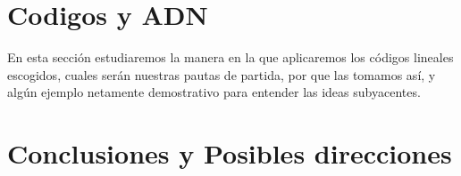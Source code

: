 \documentclass[12pt]{article}
\begin{document}
\section{Codigos y ADN}
En esta sección estudiaremos la manera en la que aplicaremos los códigos lineales escogidos, cuales serán nuestras pautas de partida, por que las tomamos así, y algún ejemplo netamente demostrativo para entender las ideas subyacentes.


\section{Conclusiones y Posibles direcciones}




\nocite{*}
\end{document}
